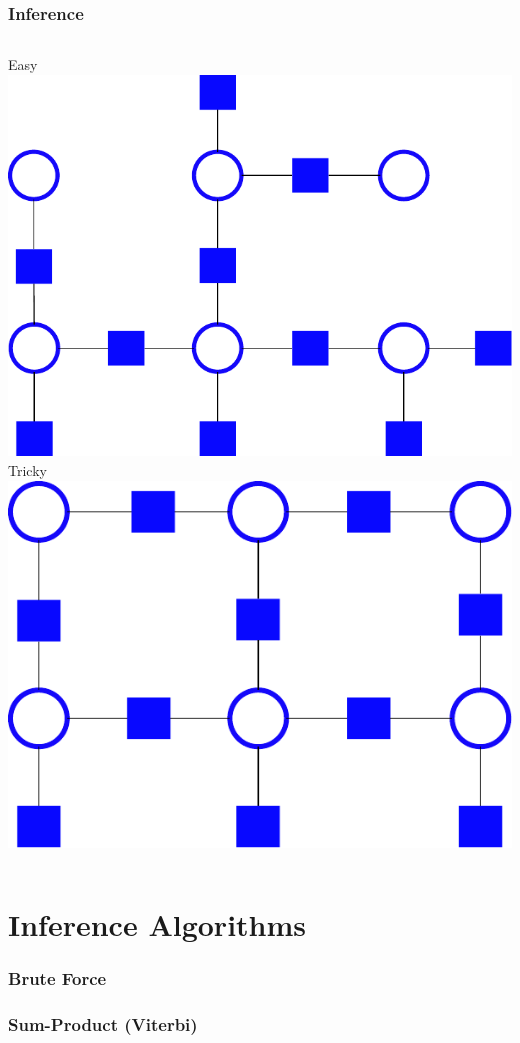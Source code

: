 \documentclass[final,ignorenonframetext,compress]{beamer}
\begin{document}
\begin{frame}
    \frametitle{Inference}
    \begin{columns}[t]
        Easy\\
        \vspace{5mm}
        \includegraphics[width=.8\textwidth]{images/tree_white_bg}
        Tricky\\
        \vspace{5mm}
        \includegraphics[width=.8\textwidth]{images/grid_white_bg}
    \end{columns}
\end{frame}

\section{Inference Algorithms}
\begin{frame}
    \frametitle{Brute Force}
\end{frame}

\begin{frame}
    \frametitle{Sum-Product (Viterbi)}
\end{frame}
\end{document}
